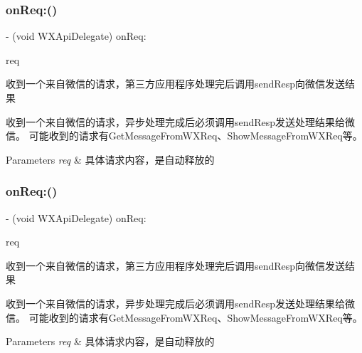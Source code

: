 \subsubsection{\texorpdfstring{on\+Req\+:()}{onReq:()}\hspace{0.1cm}{\footnotesize\ttfamily [2/3]}}
{\footnotesize\ttfamily -\/ (void W\+X\+Api\+Delegate) on\+Req\+: \begin{DoxyParamCaption}\item[{(\mbox{\hyperlink{interface_base_req}{Base\+Req}} $\ast$)}]{req }\end{DoxyParamCaption}\hspace{0.3cm}{\ttfamily [optional]}}



收到一个来自微信的请求，第三方应用程序处理完后调用send\+Resp向微信发送结果 

收到一个来自微信的请求，异步处理完成后必须调用send\+Resp发送处理结果给微信。 可能收到的请求有\+Get\+Message\+From\+W\+X\+Req、\+Show\+Message\+From\+W\+X\+Req等。 
\begin{DoxyParams}{Parameters}
{\em req} & 具体请求内容，是自动释放的 \\
\hline
\end{DoxyParams}
\mbox{\label{protocol_w_x_api_delegate_01-p_a185c8b9b51ff2398667dbf8cedffc8d6}} 
\subsubsection{\texorpdfstring{on\+Req\+:()}{onReq:()}\hspace{0.1cm}{\footnotesize\ttfamily [3/3]}}
{\footnotesize\ttfamily -\/ (void W\+X\+Api\+Delegate) on\+Req\+: \begin{DoxyParamCaption}\item[{(\mbox{\hyperlink{interface_base_req}{Base\+Req}} $\ast$)}]{req }\end{DoxyParamCaption}\hspace{0.3cm}{\ttfamily [optional]}}



收到一个来自微信的请求，第三方应用程序处理完后调用send\+Resp向微信发送结果 

收到一个来自微信的请求，异步处理完成后必须调用send\+Resp发送处理结果给微信。 可能收到的请求有\+Get\+Message\+From\+W\+X\+Req、\+Show\+Message\+From\+W\+X\+Req等。 
\begin{DoxyParams}{Parameters}
{\em req} & 具体请求内容，是自动释放的 \\
\hline
\end{DoxyParams}
\mbox{\label{protocol_w_x_api_delegate_01-p_a241d3c0bbfa2c223235df0f1b118b687}} 
